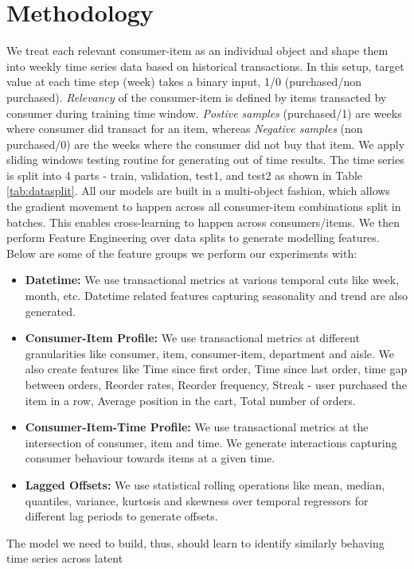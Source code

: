 \section{Methodology}
\label{sec:methodology}
We treat each relevant consumer-item as an individual object and shape them into weekly time series data
based on historical transactions. In this setup, target value at each time step (week) takes a binary input, 1/0 
(purchased/non purchased). \emph{Relevancy} of the consumer-item is defined by items transacted by consumer during training 
time window. \emph{Postive samples} (purchased/1) are weeks where consumer did transact for an item, whereas 
\emph{Negative samples} (non purchased/0) are the weeks where the consumer did not buy that item.
We apply sliding windows testing routine for generating
out of time results. The time series is split into 4 parts - train, validation, 
test1, and test2 as shown in Table \ref{tab:datasplit}. All our models are built in a multi-object 
fashion, which allows the gradient movement to happen across all consumer-item combinations split in batches. This enables 
cross-learning to happen across consumers/items. We then perform Feature Engineering over data splits to generate
modelling features. Below are some of the feature groups we perform our experiments with:
\begin{itemize}
\item {\bf Datetime:} We use transactional metrics at various temporal cuts like week, month, etc.
Datetime related features capturing seasonality and trend are also generated.
\item {\bf Consumer-Item Profile:} We use transactional metrics at different granularities like consumer, item,
consumer-item, department and aisle. We also create features like Time since first order, 
Time since last order, time gap between orders, Reorder rates, Reorder frequency, 
Streak - user purchased the item in a row, Average position in the cart, Total number of orders.
\item {\bf Consumer-Item-Time Profile:} We use transactional metrics at the intersection of consumer, item and time.
We generate interactions capturing consumer behaviour towards items at a given time.
\item {\bf Lagged Offsets:} We use statistical rolling operations like mean, median, quantiles, variance, 
kurtosis and skewness over temporal regressors for different lag periods to generate offsets.
\end{itemize}
The model we need to build, thus, should learn to identify similarly behaving time series across latent
